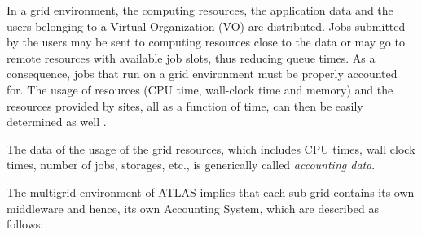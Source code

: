 In a grid environment, the computing resources, the application data
and the users belonging to a Virtual Organization (VO) are
distributed. Jobs submitted by the users may be sent to computing
resources close to the data or may go to remote resources with
available job slots, thus reducing queue times. As a consequence, jobs
that run on a grid environment must be properly accounted for. The
usage of resources (CPU time, wall-clock time and memory) and the
resources provided by sites, all as a function of time, can then be
easily determined as well \cite{accLHC}.

The data of the usage of the grid resources, which includes CPU times,
wall clock times, number of jobs, storages, etc., is generically
called {\itshape accounting data}.


The multigrid environment of ATLAS implies that each sub-grid contains
its own middleware and hence, its own Accounting System, which are
described as follows:


